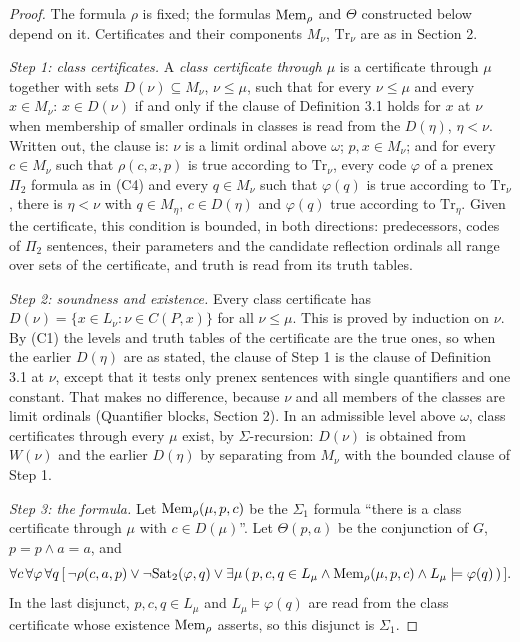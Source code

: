 \documentclass[11pt]{article}
\begin{document}
\begin{proof}
The formula $\rho$ is fixed; the formulas $\mathrm{Mem}_\rho$ and $\Theta$ constructed below depend on it. Certificates and
their components $M_\nu$, $\mathrm{Tr}_\nu$ are as in Section 2.

\emph{Step 1: class certificates.} A \emph{class certificate through $\mu$} is a certificate through $\mu$ together
with sets $D(\nu) \subseteq M_\nu$, $\nu \le \mu$, such that for every $\nu \le \mu$ and every $x \in M_\nu$:
$x \in D(\nu)$ if and only if the clause of Definition 3.1 holds for $x$ at $\nu$ when membership of smaller ordinals
in classes is read from the $D(\eta)$, $\eta < \nu$. Written out, the clause is: $\nu$ is a limit ordinal above
$\omega$; $p, x \in M_\nu$; and for every $c \in M_\nu$ such that $\rho(c, x, p)$ is true according to
$\mathrm{Tr}_\nu$, every code $\varphi$ of a prenex $\Pi_2$ formula as in (C4) and every $q \in M_\nu$ such that
$\varphi(q)$ is true according to $\mathrm{Tr}_\nu$, there is $\eta < \nu$ with $q \in M_\eta$, $c \in D(\eta)$ and
$\varphi(q)$ true according to $\mathrm{Tr}_\eta$. Given the certificate, this condition is bounded, in both
directions: predecessors, codes of $\Pi_2$ sentences, their parameters and the candidate reflection ordinals all range
over sets of the certificate, and truth is read from its truth tables.

\emph{Step 2: soundness and existence.} Every class certificate has $D(\nu) = \{x \in L_{\nu} : \nu \in C(P, x)\}$ for
all $\nu \le \mu$. This is proved by induction on $\nu$. By (C1) the levels and truth tables of the certificate are the true
ones, so when the earlier $D(\eta)$ are as stated, the clause of Step 1 is the clause of Definition 3.1 at $\nu$,
except that it tests only prenex sentences with single quantifiers and one constant. That makes no difference,
because $\nu$ and all members of the classes are limit ordinals (Quantifier blocks, Section 2). In an admissible level
above $\omega$, class certificates through every $\mu$ exist, by $\Sigma$-recursion: $D(\nu)$ is obtained from
$W(\nu)$ and the earlier $D(\eta)$ by separating from $M_\nu$ with the bounded clause of Step 1.

\emph{Step 3: the formula.} Let $\mathrm{Mem}_\rho(\mu, p, c)$ be the $\Sigma_1$ formula ``there is a class certificate
through $\mu$ with $c \in D(\mu)$''. Let $\Theta(p, a)$ be the conjunction of $G$, $p = p \wedge a = a$, and
\[ \forall c\, \forall \varphi\, \forall q\, [\, \neg\rho(c, a, p) \vee \neg\mathrm{Sat}_2(\varphi, q) \vee \exists \mu\,
(\, p, c, q \in L_{\mu} \wedge \mathrm{Mem}_\rho(\mu, p, c) \wedge L_{\mu} \models \varphi(q)\, )\, ]. \]
In the last disjunct, $p, c, q \in L_{\mu}$ and $L_{\mu} \models \varphi(q)$ are read from the class certificate whose
existence $\mathrm{Mem}_\rho$ asserts, so this disjunct is $\Sigma_1$.


\end{proof}
\end{document}
